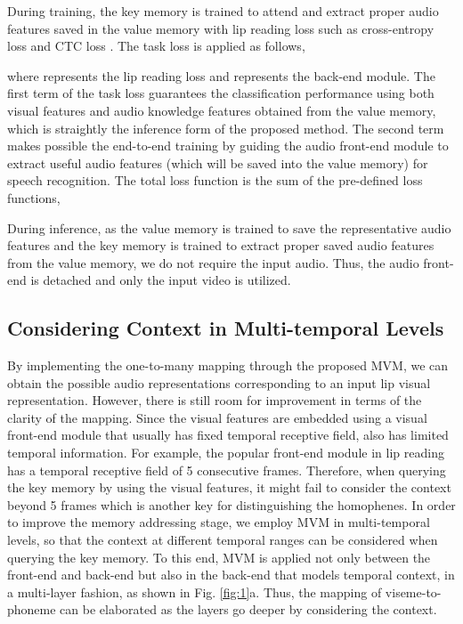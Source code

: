 \documentclass[letterpaper]{article} \usepackage{aaai22}  \usepackage{times}  \usepackage{helvet}  \usepackage{courier}  \usepackage[hyphens]{url}  \usepackage{graphicx} \urlstyle{rm} \def\UrlFont{\rm}  \usepackage{natbib}  \usepackage{caption} \DeclareCaptionStyle{ruled}{labelfont=normalfont,labelsep=colon,strut=off} \frenchspacing  \setlength{\pdfpagewidth}{8.5in}  \setlength{\pdfpageheight}{11in}  \usepackage{algorithm}
\begin{document}
During training, the key memory  is trained to attend and extract proper audio features saved in the value memory with lip reading loss such as cross-entropy loss and CTC loss \cite{graves2006ctc}. The task loss is applied as follows,

where  represents the lip reading loss and  represents the back-end module. The first term of the task loss guarantees the classification performance using both visual features  and audio knowledge features  obtained from the value memory, which is straightly the inference form of the proposed method. The second term makes possible the end-to-end training by guiding the audio front-end module to extract useful audio features (which will be saved into the value memory) for speech recognition.
The total loss function is the sum of the pre-defined loss functions,


During inference, as the value memory is trained to save the representative audio features and the key memory is trained to extract proper saved audio features from the value memory, we do not require the input audio. Thus, the audio front-end is detached and only the input video is utilized.

\subsection{Considering Context in Multi-temporal Levels}
By implementing the one-to-many mapping through the proposed MVM, we can obtain the possible audio representations corresponding to an input lip visual representation. However, there is still room for improvement in terms of the clarity of the mapping. Since the visual features  are embedded using a visual front-end module that usually has fixed temporal receptive field,  also has limited temporal information. For example, the popular front-end module \cite{petridis2017resnetlstm} in lip reading has a temporal receptive field of 5 consecutive frames. Therefore, when querying the key memory by using the visual features, it might fail to consider the context beyond 5 frames which is another key for distinguishing the homophenes. In order to improve the memory addressing stage, we employ MVM in multi-temporal levels, so that the context at different temporal ranges can be considered when querying the key memory. To this end, MVM is applied not only between the front-end and back-end but also in the back-end that models temporal context, in a multi-layer fashion, as shown in Fig. \ref{fig:1}a. Thus, the mapping of viseme-to-phoneme can be elaborated as the layers go deeper by considering the context.
\end{document}
